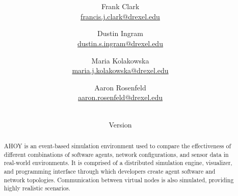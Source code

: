 \documentclass[titlepage]{article}
\title{\textbf{\mytitle}}
\author{
	Frank Clark \\\url{francis.j.clark@drexel.edu}
    \and Dustin Ingram \\\url{dustin.s.ingram@drexel.edu}
	\and Maria Kolakowska \\\url{maria.j.kolakowska@drexel.edu}
    \and Aaron Rosenfeld \\\url{aaron.rosenfeld@drexel.edu}
}
\date{\mydate\\Version \myversion}
\begin{document}

\begin{figure*}
    \centering
    \scalebox{0.8}{}
    \vspace{-4em}
\end{figure*}

\maketitle

\begin{abstract}
AHOY is an event-based simulation environment used to compare the effectiveness of different combinations of software agents, network configurations, and sensor data in real-world environments.  It is comprised of a distributed simulation engine, visualizer, and programming interface through which developers create agent software and network topologies.  Communication between virtual nodes is also simulated, providing highly realistic scenarios.
\end{abstract}

\setcounter{tocdepth}{4}
\tableofcontents
\pagebreak
\listoffigures
\pagebreak
{}


%
%
%

\end{document}
